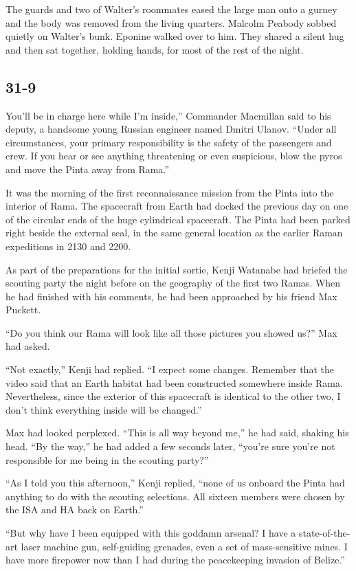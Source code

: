 \documentclass[]{article}
\begin{document}
{The guards and two of Walter’s roommates eased the large man onto a gurney and the body was removed from the living quarters. Malcolm Peabody sobbed quietly on Walter’s bunk. Eponine walked over to him. They shared a silent hug and then sat together, holding hands, for most of the rest of the night.


\subsection{31-9}

You’ll be in charge here while I’m inside,” Commander Macmillan said to his deputy, a handsome young Russian engineer named Dmitri Ulanov. “Under all circumstances, your primary responsibility is the safety of the passengers and crew. If you hear or see anything threatening or even suspicious, blow the pyros and move the Pinta away from Rama.”

It was the morning of the first reconnaissance mission from the Pinta into the interior of Rama. The spacecraft from Earth had docked the previous day on one of the circular ends of the huge cylindrical spacecraft. The Pinta had been parked right beside the external seal, in the same general location as the earlier Raman expeditions in 2130 and 2200.

As part of the preparations for the initial sortie, Kenji Watanabe had briefed the scouting party the night before on the geography of the first two Ramas. When he had finished with his comments, he had been approached by his friend Max Puckett.

“Do you think our Rama will look like all those pictures you showed us?” Max had asked.

“Not exactly,” Kenji had replied. “I expect some changes. Remember that the video said that an Earth habitat had been constructed somewhere inside Rama. Nevertheless, since the exterior of this spacecraft is identical to the other two, I don’t think everything inside will be changed.”

Max had looked perplexed. “This is all way beyond me,” he had said, shaking his head. “By the way,” he had added a few seconds later, “you’re sure you’re not responsible for me being in the scouting party?”

“As I told you this afternoon,” Kenji replied, “none of us onboard the Pinta had anything to do with the scouting selections. All sixteen members were chosen by the ISA and HA back on Earth.”

“But why have I been equipped with this goddamn arsenal? I have a state-of-the-art laser machine gun, self-guiding grenades, even a set of mass-sensitive mines. I have more firepower now than I had during the peacekeeping invasion of Belize.”

}
\end{document}
